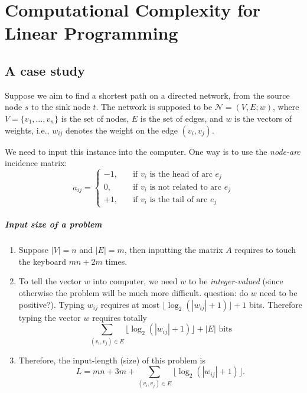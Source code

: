 \chapter{Computational Complexity for Linear Programming}

\section{A case study}
Suppose we aim to find a shortest path on a directed network, from the source node $s$ to the sink node $t$. The network is supposed to be $\mathcal{N}=(V,E;w)$, where $V=\{v_1,\dots,v_n\}$ is the set of nodes, $E$ is the set of edges, and $w$ is the vectors of weights, i.e., $w_{ij}$ denotes the weight on the edge $(v_i,v_j)$.

We need to input this instance into the computer. One way is to use the \emph{node-arc} incidence matrix:
\[
a_{ij}=\left\{
\begin{aligned}
-1,&\quad\text{if $v_i$ is the head of arc $e_j$}\\
0,&\quad\text{if $v_i$ is not related to arc $e_j$}\\
+1,&\quad\text{if $v_i$ is the tail of arc $e_j$}
\end{aligned}
\right.
\]
\paragraph{Input size of a problem}
\begin{enumerate}
\item
Suppose $|V|=n$ and $|E| = m$, then inputting the matrix $A$ requires to touch the keyboard $mn+2m$ times.
\item
To tell the vector $w$ into computer, we need $w$ to be \emph{integer-valued} (since otherwise the problem will be much more difficult. question: do $w$ need to be positive?). Typing $w_{ij}$ requires at most $\lfloor\log_2(|w_{ij}|+1)\rfloor+1$ bits. Therefore typing the vector $w$ requires totally 
\[
\sum_{(v_i,v_j)\in E}\lfloor\log_2(|w_{ij}|+1)\rfloor+|E|\text{ bits}
\]
\item
Therefore, the input-length (size) of this problem is
\[
L = mn + 3m + \sum_{(v_i,v_j)\in E}\lfloor\log_2(|w_{ij}|+1)\rfloor.
\]
\end{enumerate}

